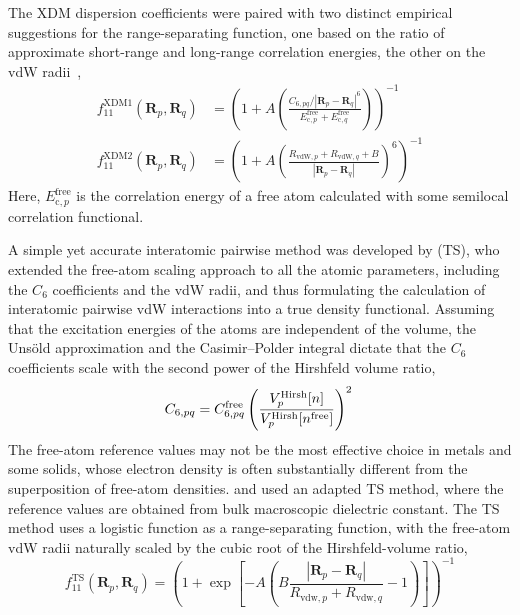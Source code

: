 The XDM dispersion coefficients were paired with two distinct empirical suggestions for the range-separating function, one based on the ratio of approximate short-range and long-range correlation energies, the other on the vdW radii~\cite{BeckeJCP07},
\begin{align}
f_{11}^\text{XDM1}(\mathbf R_p,\mathbf R_q)&=\left(1+A\left(
  \frac{C_{6,pq}/|\mathbf R_p-\mathbf R_q|^6}
{E_{\text{c},p}^\text{free}+E_{\text{c},q}^\text{free}}\right)\right)^{-1} \\
f_{11}^\text{XDM2}(\mathbf R_p,\mathbf R_q)&=\left(1+A\left(\frac{R_{\text{vdW},p}+R_{\text{vdW},q}+B}{|\mathbf R_p-\mathbf R_q|}\right)^6\right)^{-1}
\end{align}
Here, $E_{\text{c},p}^\text{free}$ is the correlation energy of a free atom calculated with some semilocal correlation functional.

A simple yet accurate interatomic pairwise method was developed by \citet{TkatchenkoPRL09} (TS), who extended the free-atom scaling approach to all the atomic parameters, including the $C_6$ coefficients and the vdW radii, and thus formulating the calculation of interatomic pairwise vdW interactions into a true density functional.
Assuming that the excitation energies of the atoms are independent of the volume, the Unsöld approximation and the Casimir--Polder integral dictate that the $C_6$ coefficients scale with the second power of the Hirshfeld volume ratio,
\begin{equation}
  C_{6,pq}=C_{6,pq}^\text{free}\left(\frac{V^\text{Hirsh}_p[n]}{V^\text{Hirsh}_p[n^\text{free}]}\right)^2 \\
\label{eq:TS}
\end{equation}
The free-atom reference values may not be the most effective choice in metals and some solids, whose electron density is often substantially different from the superposition of free-atom densities.
\citet{ZhangPRL11} and \citet{RuizPRL12} used an adapted TS method, where the reference values are obtained from bulk macroscopic dielectric constant.
The TS method uses a logistic function as a range-separating function, with the free-atom vdW radii naturally scaled by the cubic root of the Hirshfeld-volume ratio,
\begin{equation}
  \label{eq:damping-ts}
  f_{11}^\text{TS}(\mathbf R_p,\mathbf R_q)=\left(1
    +\exp\left[
      -A\left(B\frac{|\mathbf R_p-\mathbf R_q|}{R_{\text{vdw},p}+R_{\text{vdw},q}}-1\right)
    \right]\right)^{-1}
\end{equation}

